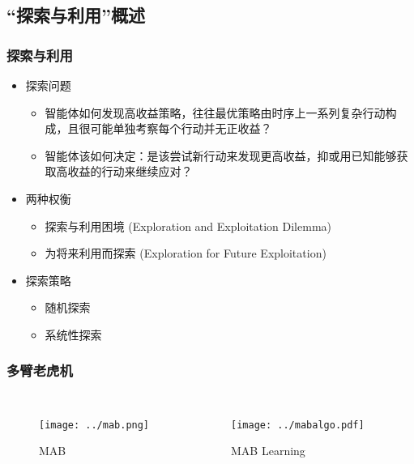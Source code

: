 \documentclass{beamer}
\begin{document}
\begin{CJK*}{GBK}{hei}
\section{“探索与利用”概述}
\begin{frame}\frametitle{探索与利用}
\begin{itemize}
\item 探索问题\citep{Levinecs294}
{
    \begin{itemize}
        \item 智能体如何发现高收益策略，往往最优策略由时序上一系列复杂行动构成，且很可能单独考察每个行动并无正收益？
        \item 智能体该如何决定：是该尝试新行动来发现更高收益，抑或用已知能够获取高收益的行动来继续应对？
    \end{itemize}
}
\item 两种权衡\citep{liangpengzhang2019}
{
\begin{itemize}
\item 探索与利用困境 (Exploration and Exploitation Dilemma)
\item 为将来利用而探索 (Exploration for Future Exploitation)
\end{itemize}
}
\item 探索策略\citep{liangpengzhang2019}
{
\begin{itemize}
\item 随机探索
\item 系统性探索
\end{itemize}
}
\end{itemize}
\end{frame}

\begin{frame}\frametitle{多臂老虎机}
\begin{columns}
    \begin{figure}[htbp]
        \centering\texttt{[image: ../mab.png]}
	\caption{MAB}
    \end{figure}
    \begin{figure}[htbp]
        \centering\texttt{[image: ../mabalgo.pdf]}
	\caption{MAB Learning\citep{stochasticmab}}
    \end{figure}
\end{columns}
\end{frame}


\end{CJK*}
\end{document}
